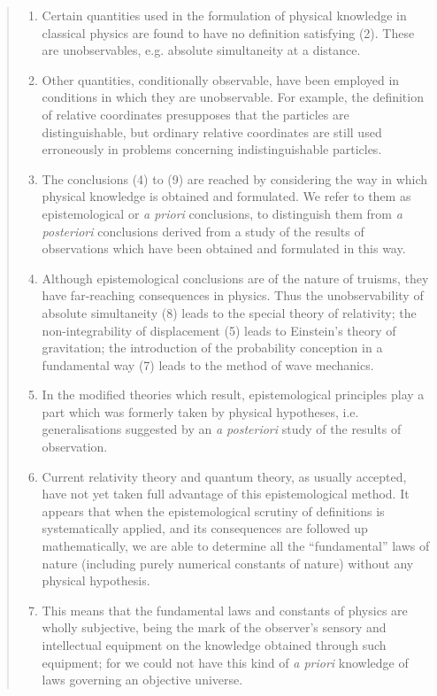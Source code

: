 \begin{quote}
\begin{enumerate}
        \item Certain quantities used in the formulation of physical  knowledge in classical physics are found to have no definition satisfying (2).  These are unobservables, e.g. absolute simultaneity at a distance.
        \item Other quantities, conditionally observable, have been employed in conditions in which they are unobservable.  For example, the definition of relative coordinates presupposes that the particles are distinguishable, but ordinary relative coordinates are still used erroneously in problems concerning indistinguishable particles.
        \item The conclusions (4) to (9) are reached by considering the way in which physical knowledge is obtained and formulated. We refer to them as epistemological or \emph{a priori} conclusions, to distinguish them from \emph{a posteriori} conclusions derived from a study of the results of observations which have been obtained and formulated in this way.
        \item Although epistemological conclusions are of the nature of truisms, they have far-reaching consequences in physics.  Thus the unobservability of absolute simultaneity (8) leads to the special theory of relativity; the non-integrability of displacement (5) leads to Einstein's theory of gravitation; the introduction of the probability conception in a fundamental way (7) leads to the method of wave mechanics.
        \item In the modified theories which result, epistemological principles play a part which was formerly taken by physical hypotheses, i.e. generalisations suggested by an \emph{a posteriori} study of the results of observation.
        \item Current relativity theory and quantum theory, as usually accepted, have not yet taken full advantage of this epistemological method.  It appears that when the epistemological scrutiny of definitions is systematically applied, and its consequences are followed up mathematically, we are able to determine all the ``fundamental'' laws of nature (including purely numerical constants of nature) without any physical hypothesis.
        \item This means that the fundamental laws and constants of physics are wholly subjective, being the mark of the observer's sensory and intellectual equipment on the knowledge obtained through such equipment; for we could not have this kind of \emph{a priori} knowledge of laws governing an objective universe.

\end{enumerate}
\end{quote}
